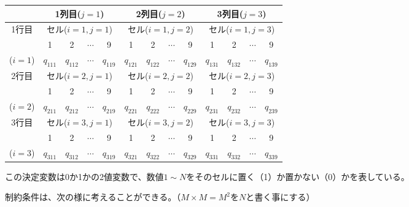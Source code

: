 \documentclass[uplatex,dvipdfmx,a4paper,11pt,oneside,openany]{jsbook}
\begin{document}
\begin{center}
\begin{tabular}{|c||c|c| c |c||c|c| c |c||c|c| c |c|} \hline
  &\multicolumn{4}{|c||}{1列目($j=1$)}&\multicolumn{4}{|c||}{2列目($j=2$)}&\multicolumn{4}{|c|}{3列目($j=3$)}\\\hline\hline
  \multirow{2}{*}{1行目}&\multicolumn{4}{|c||}{セル($i=1, j=1$)}&\multicolumn{4}{|c||}{セル($i=1, j=2$)}&\multicolumn{4}{|c|}{セル($i=1, j=3$)}\\\cline{2-13}
  &1&2& $\cdots$ &9& 1&2& $\cdots$ &9& 1&2&$\cdots$ &9 \\\cline{2-13}
  ($i=1$)&$q_{111}$&$q_{112}$& $\cdots$ &$q_{119}$& $q_{121}$&$q_{122}$&$\cdots$&$q_{129}$& $q_{131}$&$q_{132}$&$\cdots$&$q_{139}$ \\\hline\hline
  \multirow{2}{*}{2行目}&\multicolumn{4}{|c||}{セル($i=2, j=1$)}&\multicolumn{4}{|c||}{セル($i=2, j=2$)}&\multicolumn{4}{|c|}{セル($i=2, j=3$)}\\\cline{2-13}
  &1&2& $\cdots$ &9& 1&2& $\cdots$ &9& 1&2&$\cdots$ &9 \\\cline{2-13}
  ($i=2$)&$q_{211}$&$q_{212}$& $\cdots$ &$q_{219}$& $q_{221}$&$q_{222}$&$\cdots$&$q_{229}$& $q_{231}$&$q_{232}$&$\cdots$&$q_{239}$ \\\hline\hline
  \multirow{2}{*}{3行目}&\multicolumn{4}{|c||}{セル($i=3, j=1$)}&\multicolumn{4}{|c||}{セル($i=3, j=2$)}&\multicolumn{4}{|c|}{セル($i=3, j=3$)}\\\cline{2-13}
  &1&2& $\cdots$ &9& 1&2& $\cdots$ &9& 1&2&$\cdots$ &9 \\\cline{2-13}
  ($i=3$)&$q_{311}$&$q_{312}$& $\cdots$ &$q_{319}$& $q_{321}$&$q_{322}$&$\cdots$&$q_{329}$& $q_{331}$&$q_{332}$&$\cdots$&$q_{339}$ \\\hline
\end{tabular}
\end{center}

この決定変数は0か1かの2値変数で、数値$1\sim N$をそのセルに置く（1）か置かない（0）かを表している。

\newpage

制約条件は、次の様に考えることができる。（$M\times M=M^2$を$N$と書く事にする）
\end{document}
